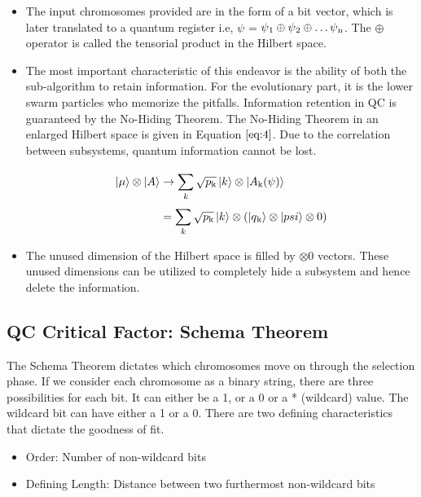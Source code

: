 \documentclass[conference]{IEEEtran}
\begin{document}
\begin{itemize}
\item The input chromosomes provided are in the form of a bit vector, which is later translated to a quantum register i.e, $\psi$ = $\psi\textsubscript{1} \oplus \psi\textsubscript{2} \oplus \dots \psi\textsubscript{n}$. The $\oplus$ operator is called the tensorial product in the Hilbert space.

\item The most important characteristic of this endeavor is the ability of both the sub-algorithm to retain information. For the evolutionary part, it is the lower swarm particles who memorize the pitfalls. Information retention in QC is guaranteed by the No-Hiding Theorem. The No-Hiding Theorem in an enlarged Hilbert space is given in Equation $\ref{eq:4}$. Due to the correlation between subsystems, quantum information cannot be lost. 

\begin{equation}
\label{eq:4}
\begin{split}
\ket{\mu} \otimes \ket{A} & \rightarrow \sum_{k}^{}\sqrt{p\textsubscript{k}}\ket{k} \otimes \ket{A\textsubscript{k}(\psi)}\\
& = \sum_{k}^{}\sqrt{p\textsubscript{k}}\ket{k} \otimes (\ket{q\textsubscript{k}} \otimes \ket{psi} \otimes 0)
\end{split}
\end{equation}

\item The unused dimension of the Hilbert space is filled by $\otimes 0$ vectors. These unused dimensions can be utilized to completely hide a subsystem and hence delete the information.
\end{itemize}

\subsection{QC Critical Factor: Schema Theorem}
The Schema Theorem \cite{st} dictates which chromosomes move on through the selection phase. If we consider each chromosome as a binary string, there are three possibilities for each bit. It can either be a 1, or a 0 or a * (wildcard) value. The wildcard bit can have either a 1 or a 0. There are two defining characteristics that dictate the goodness of fit. 

\begin{itemize}
\item Order: Number of non-wildcard bits 
\item Defining Length: Distance between two furthermost non-wildcard bits
\end{itemize}
\end{document}
